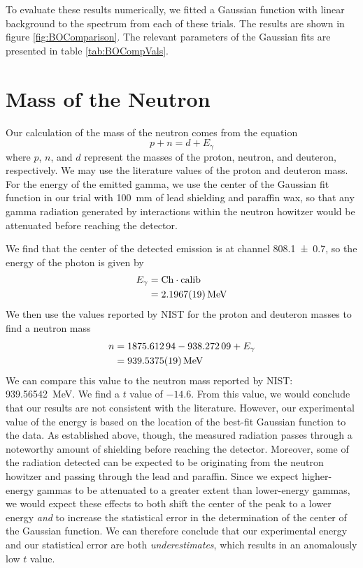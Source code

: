 \documentclass[letter]{article}
\begin{document}
To evaluate these results numerically, we fitted a Gaussian function with linear background to the spectrum from each of these trials. The results are shown in figure \ref{fig:BOComparison}. The relevant parameters of the Gaussian fits are presented in table \ref{tab:BOCompVals}.


\section{Mass of the Neutron}

Our calculation of the mass of the neutron comes from the equation
\begin{equation}
p + n = d + E_\gamma
\end{equation}
where $p$, $n$, and $d$ represent the masses of the proton, neutron, and deuteron, respectively. We may use the literature values of the proton and deuteron mass. For the energy of the emitted gamma, we use the center of the Gaussian fit function in our trial with \qty{100}{\mm} of lead shielding and paraffin wax, so that any gamma radiation generated by interactions within the neutron howitzer would be attenuated before reaching the detector.

We find that the center of the detected emission is at channel \num{808.1\pm.7}, so the energy of the photon is given by
\begin{align*}
E_\gamma &= \text{Ch} \cdot \text{calib}
\\
&=
\qty{2.1967 \pm 0.0019}{\mega\electronvolt}
\end{align*}
We then use the values reported by NIST for the proton and deuteron masses to find a neutron mass
\begin{align*}
n &= \num{1875.61294} - \num{938.27209} + E_\gamma
\\&=
\qty{939.5375 \pm 0.0019}{\mega\electronvolt}
\end{align*}
We can compare this value to the neutron mass reported by NIST: \qty{939.56542}{\mega\electronvolt}. We find a $t$ value of $-14.6$. From this value, we would conclude that our results are not consistent with the literature. However, our experimental value of the energy is based on the location of the best-fit Gaussian function to the data. As established above, though, the measured radiation passes through a noteworthy amount of shielding before reaching the detector. Moreover, some of the radiation detected can be expected to be originating from the neutron howitzer and passing through the lead and paraffin. Since we expect higher-energy gammas to be attenuated to a greater extent than lower-energy gammas, we would expect these effects to both shift the center of the peak to a lower energy \textit{and} to increase the statistical error in the determination of the center of the Gaussian function. We can therefore conclude that our experimental energy and our statistical error are both \textit{underestimates}, which results in an anomalously low $t$ value.
\end{document}
